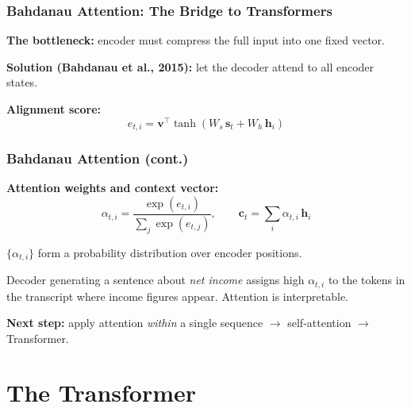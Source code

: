 \documentclass[9pt,t]{beamer}
\begin{document}
\begin{frame}
\frametitle{Bahdanau Attention: The Bridge to Transformers}

\textbf{The bottleneck:} encoder must compress the full input into one fixed vector.

\medskip
\textbf{Solution (Bahdanau et al., 2015):} let the decoder attend to all encoder states.

\medskip
\textbf{Alignment score:}
\[
e_{t,i} = \mathbf{v}^\top \tanh\!\left(W_s\,\mathbf{s}_t + W_h\,\mathbf{h}_i\right)
\]
\end{frame}

\begin{frame}
\frametitle{Bahdanau Attention (cont.)}

\textbf{Attention weights and context vector:}
\[
\alpha_{t,i} = \frac{\exp(e_{t,i})}{\sum_j \exp(e_{t,j})},
\qquad
\mathbf{c}_t = \sum_{i} \alpha_{t,i}\,\mathbf{h}_i
\]

$\{\alpha_{t,i}\}$ form a probability distribution over encoder positions.
\medskip

\begin{bigpicture}
Decoder generating a sentence about \emph{net income} assigns high $\alpha_{t,i}$
to the tokens in the transcript where income figures appear. Attention is interpretable.
\end{bigpicture}

\medskip
\textbf{Next step:} apply attention \emph{within} a single sequence $\to$ self-attention $\to$ Transformer.
\end{frame}

\section{The Transformer}
\end{document}
